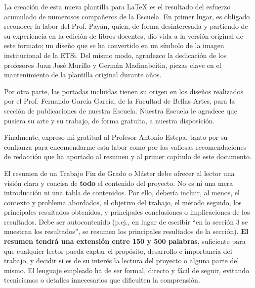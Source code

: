 
La creación de esta nueva plantilla para \LaTeX{} es el resultado del esfuerzo acumulado de numerosos compañeros de la Escuela. En primer lugar, es obligado reconocer la labor del Prof. Payán, quien, de forma desinteresada y partiendo de su experiencia en la edición de libros docentes, dio vida a la versión original de este formato; un diseño que se ha convertido en un símbolo de la imagen institucional de la ETSi. Del mismo modo, agradezco la dedicación de los profesores Juan José Murillo y Germán Madinabeitia, piezas clave en el mantenimiento de la plantilla original durante años.

Por otra parte, las portadas incluidas tienen su origen en los diseños realizados por el Prof. Fernando García García, de la Facultad de Bellas Artes, para la sección de publicaciones de nuestra Escuela. Nuestra Escuela le agradece que pusiera su arte y su trabajo, de forma gratuita, a nuestra disposición.

Finalmente, expreso mi gratitud al Profesor Antonio Estepa, tanto por su confianza para encomendarme esta labor como por las valiosas recomendaciones de redacción que ha aportado al resumen y al primer capítulo de este documento.

{}%
{}%


El resumen de un Trabajo Fin de Grado o Máster debe ofrecer al lector una visión clara y concisa de \textbf{todo} el contenido del proyecto. No es ni una mera introducción ni una tabla de contenidos. Por ello, debería incluir, al menos, el contexto y problema abordados, el objetivo del trabajo, el método seguido, los principales resultados obtenidos, y principales conclusiones o implicaciones de los resultados. Debe ser autocontenido (p.ej., en lugar de escribir ``en la sección 3 se muestran los resultados'', se resumen los principales resultados de la sección). \textbf{El resumen tendrá una extensión entre 150 y 500 palabras}, suficiente para que cualquier lector pueda captar el propósito, desarrollo e importancia del trabajo, y decidir si es de su interés la lectura del proyecto o alguna parte del mismo.  El lenguaje empleado ha de ser formal, directo y fácil de seguir, evitando tecnicismos o detalles innecesarios que dificulten la comprensión. 

